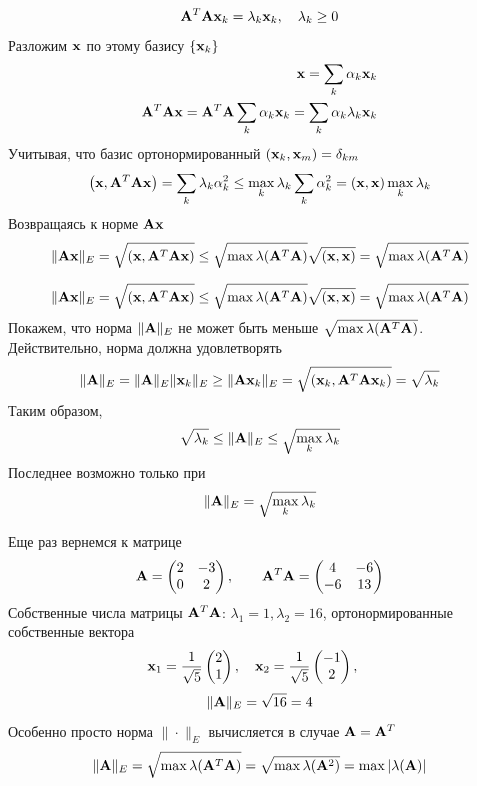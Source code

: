 \documentclass[professionalfonts,compress,unicode]{beamer}
\begin{document}
{
	$$
	{\bf A}^T{\bf A} {\bf x}_k = \lambda_k {\bf x}_k, \quad \lambda_k \geq 0
	$$
	Разложим ${\bf x}$ по этому базису $\left\{{\bf x}_k\right\}$
	\begin{align*}
	{\bf x} = \sum_k \alpha_k {\bf x}_k\\
	{\bf A}^T{\bf A}{\bf x} = {\bf A}^T{\bf A} \sum_k \alpha_k {\bf x}_k = \sum_k \alpha_k \lambda_k {\bf x}_k
	\end{align*}
	Учитывая, что базис ортонормированный $({\bf x}_k,{\bf x}_m) = \delta_{km}$
	$$
	\left({\bf x},{\bf A}^T{\bf A}{\bf x}\right) = \sum_k \lambda_k \alpha_k^2 \leq \max_k \lambda_k \sum_k \alpha_k^2 = \left({\bf x},{\bf x}\right) \max_k \lambda_k 
	$$
	Возвращаясь к норме ${\bf A}{\bf x}$
	$$
	\|{\bf A}{\bf x}\|_E = \sqrt{({\bf x},{\bf A}^T{\bf A}{\bf x})} \leq \sqrt{\max \lambda({\bf A}^T{\bf A})} \sqrt{({\bf x},{\bf x})} = \sqrt{\max \lambda({\bf A}^T{\bf A})}
	$$
}

{
	$$
	\|{\bf A}{\bf x}\|_E = \sqrt{({\bf x},{\bf A}^T{\bf A}{\bf x})} \leq \sqrt{\max \lambda({\bf A}^T{\bf A})} \sqrt{({\bf x},{\bf x})} = \sqrt{\max \lambda({\bf A}^T{\bf A})}
	$$
	Покажем, что норма $\|{\bf A}\|_E$ не может быть меньше $\sqrt{\max \lambda({\bf A}^T{\bf A})}$. Действительно, норма должна удовлетворять
	$$
	\|{\bf A}\|_E = \|{\bf A}\|_E \|{\bf x}_k\|_E \geq \|{\bf A} {\bf x}_k\|_E = \sqrt{({\bf x}_k, {\bf A}^T{\bf A} {\bf x}_k)}= \sqrt{\lambda_k}
	$$
	Таким образом,
	$$
	\sqrt{\lambda_k} \leq \|{\bf A}\|_E \leq \sqrt{\max_k \lambda_k}
	$$
	Последнее возможно только при
	$$
	\|{\bf A}\|_E = \sqrt{\max_k \lambda_k}
	$$
}

{
	Еще раз вернемся к матрице 
	$$
	{\bf A} = \begin{pmatrix}
		2&-3\\
		0&2
	\end{pmatrix},\qquad
	{\bf A}^T{\bf A} = \begin{pmatrix}
		4&-6\\
		-6&13
	\end{pmatrix}
	$$
	Собственные числа матрицы ${\bf A}^T{\bf A}$: $\lambda_1 = 1, \lambda_2 = 16$, ортонормированные собственные вектора
	$$
	{\bf x}_1 = \frac{1}{\sqrt{5}}\begin{pmatrix}
		2\\1
	\end{pmatrix}, \quad
	{\bf x}_2 = \frac{1}{\sqrt{5}}\begin{pmatrix}
		-1\\2
	\end{pmatrix}, \quad	
	$$
	$$
	\|{\bf A}\|_E = \sqrt{16} = 4
	$$
	Особенно просто норма $\|\cdot\|_E$ вычисляется в случае ${\bf A} = {\bf A}^T$
	$$
	\|{\bf A}\|_E = \sqrt{\max\lambda({\bf A}^T{\bf A})} = \sqrt{\max\lambda({\bf A}^2)} = \max|\lambda({\bf A})|
	$$
}
\end{document}
